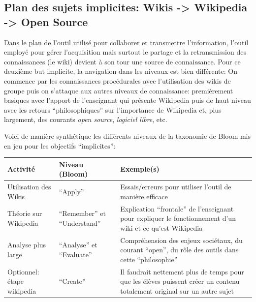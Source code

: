 \documentclass[11pt,bibliography=totoc]{scrartcl}
\newcommand\ajout[1]{{\color{blue} #1}}
\begin{document}
\subsection{Plan des sujets implicites: Wikis -> Wikipedia -> Open Source}
Dans le plan de l'outil utilisé pour collaborer et transmettre l'information,
l'outil employé pour gérer l'acquisition mais surtout le partage et la
retransmission des connaissances (le wiki) devient à son tour une source de
connaissance.  Pour ce deuxième but implicite, la navigation dans les niveaux
est bien différente: On commence par les connaissances procédurales avec
l'utilisation des wikis de groupe puis on s'attaque aux autres niveaux de
connaissance: premièrement basiques avec l'apport de l'enseignant qui présente
Wikipedia puis de haut niveau avec les retours ``philosophiques'' sur
l'importance de Wikipedia et, plus largement, des courants \textit{open source},
\textit{logiciel libre}, etc.  \ajout{Voici de manière synthétique les
  différents niveaux de la taxonomie de Bloom mis en jeu pour les objectifs
  ``implicites'':

\begin{center}
   \begin{tabular}{| m{.25\textwidth} | m{.2\textwidth} | m{.45\textwidth} | }
     \hline
     Activité & Niveau (Bloom) & Exemple(s) \\ 
     \hline
     Utilisation des Wikis & ``Apply'' & Essais/erreurs pour utiliser l'outil de manière efficace \\ 
     \hline
     Théorie sur Wikipedia & ``Remember'' et ``Understand'' & Explication
                                                              ``frontale'' de
                                                              l'enseignant pour
                                                              expliquer le
                                                              fonctionnement
                                                              d'un wiki et ce
                                                              qu'est Wikipedia \\
     \hline
     Analyse plus large & ``Analyse'' et ``Evaluate'' & Compréhension des enjeux
                                                        sociétaux, du courant
                                                        ``open'', du rôle des outils dans cette ``philosophie'' \\

     \hline
     Optionnel: étape wikipedia & ``Create'' & Il faudrait nettement plus de
                                                 temps pour que les élèves
                                                 puissent créer un contenu
                                                 totalement original sur un
                                                 autre sujet\\
     \hline
   \end{tabular}
 \end{center}
}
\end{document}
